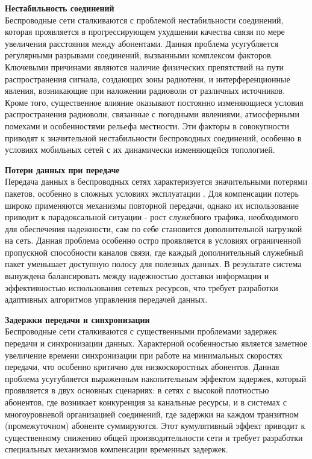 \noindent\textbf{Нестабильность соединений}  \\
Беспроводные сети сталкиваются с проблемой нестабильности соединений, которая проявляется в прогрессирующем ухудшении качества связи по мере увеличения 
расстояния между абонентами. Данная проблема усугубляется регулярными разрывами соединений, вызванными комплексом факторов. Ключевыми причинами являются 
наличие физических препятствий на пути распространения сигнала, создающих зоны радиотени, и интерференционные явления, возникающие при наложении радиоволн 
от различных источников. Кроме того, существенное влияние оказывают постоянно изменяющиеся условия распространения радиоволн, связанные с погодными 
явлениями, атмосферными помехами и особенностями рельефа местности. Эти факторы в совокупности приводят к значительной нестабильности беспроводных 
соединений, особенно в условиях мобильных сетей с их динамически изменяющейся топологией.

\noindent\textbf{Потери данных при передаче} \\
Передача данных в беспроводных сетях характеризуется значительными потерями пакетов, особенно в сложных условиях эксплуатации \cite{zuniga2004analyzing}. 
Для компенсации потерь 
широко применяются механизмы повторной передачи, однако их использование приводит к парадоксальной ситуации - рост служебного трафика, необходимого для 
обеспечения надежности, сам по себе становится дополнительной нагрузкой на сеть. Данная проблема особенно остро проявляется в условиях ограниченной 
пропускной способности каналов связи, где каждый дополнительный служебный пакет уменьшает доступную полосу для полезных данных. В результате система 
вынуждена балансировать между надежностью доставки информации и эффективностью использования сетевых ресурсов, что требует разработки адаптивных алгоритмов 
управления передачей данных.

\noindent\textbf{Задержки передачи и синхронизации} \\
Беспроводные сети сталкиваются с существенными проблемами задержек передачи и синхронизации данных. Характерной особенностью является заметное увеличение 
времени синхронизации при работе на минимальных скоростях передачи, что особенно критично для низкоскоростных абонентов. Данная проблема усугубляется 
выраженным накопительным эффектом задержек, который проявляется в двух основных сценариях: в сетях с высокой плотностью абонентов, где возникает конкуренция 
за канальные ресурсы, и в системах с многоуровневой организацией соединений, где задержки на каждом транзитном (промежуточном) абоненте суммируются. Этот 
кумулятивный эффект приводит к существенному снижению общей производительности сети и требует разработки специальных механизмов компенсации временных 
задержек.

